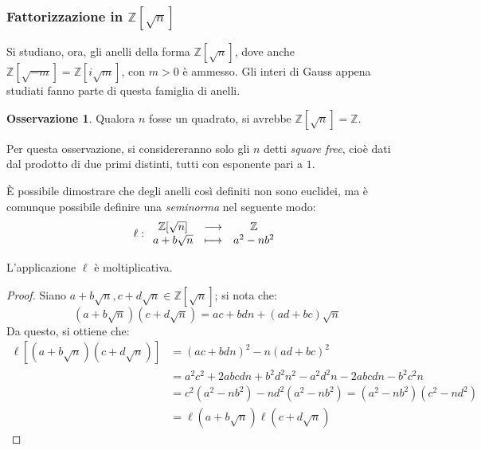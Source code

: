\documentclass[11pt, a4paper]{scrartcl}
\theoremstyle{definition}
\numberwithin{esempio}{section}
\theoremstyle{definition}
\newtheorem{obs}{Osservazione}
\numberwithin{obs}{section}
\numberwithin{nota}{section}
\numberwithin{equation}{subsection}
\begin{document}
\subsubsection{Fattorizzazione in $\mathbb{Z}[\sqrt{n}]$}
Si studiano, ora, gli anelli della forma $\mathbb{Z}[\sqrt{n} ]$, dove anche $\mathbb{Z}[\sqrt{-m} ] = \mathbb{Z}[i\sqrt{m} ]$, con $m>0$ \`e ammesso.
Gli interi di Gauss appena studiati fanno parte di questa famiglia di anelli.
\begin{obs}
Qualora $n$ fosse un quadrato, si avrebbe $\mathbb{Z}[\sqrt{n} ] = \mathbb{Z}$.
\end{obs}
\noindent Per questa osservazione, si considereranno solo gli $n$ detti \textit{square free}, cio\`e dati dal prodotto di due primi distinti, tutti con esponente pari a $1$.

\`E possibile dimostrare che degli anelli cos\`i definiti non sono euclidei, ma \`e comunque possibile definire una \textit{seminorma} nel seguente modo:
\begin{equation}
	\ell : 
	\begin{array}{c c c}
		\mathbb{Z}[\sqrt{n} ] &\longrightarrow & \mathbb{Z}\\
		a+b \sqrt{n} & \longmapsto & a^2 - nb^2
	\end{array}
\end{equation}
\begin{lemma}
	{}{}
	L'applicazione $\ell $ \`e moltiplicativa.
	\begin{proof}
		Siano $a+b \sqrt{n} , c + d \sqrt{n} \in \mathbb{Z}[\sqrt{n} ]$; si nota che:
		\[
		\left(a + b\sqrt{n} \right) \left(c + d \sqrt{n} \right) = ac + bdn + (ad + bc ) \sqrt{n} 
		\] 
		Da questo, si ottiene che:
\[
	\begin{split}
		\ell \left[ \left(a + b\sqrt{n} \right) \left(c+d\sqrt{n} \right)  \right] &= \left(ac + bdn\right) ^2 - n \left(ad + bc\right) ^2\\
											   &=a^2c^2 + 2 abcdn + b^2 d^2 n^2 - a^2 d^2 n-2abcdn - b^2c^2 n\\
											   &=c^2(a^2-nb^2) - nd^2 (a^2 - nb^2) = (a^2 - nb^2 )(c^2 - nd^2)\\
											   &=\ell \left(a + b\sqrt{n} \right) \ell \left(c+d \sqrt{n} \right) 
	\end{split}
\] 
	\end{proof}
\end{lemma}
\end{document}
